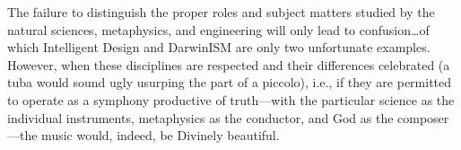 The failure to distinguish the proper roles and subject matters studied by the natural sciences, metaphysics, and engineering will only lead to confusion\ldots of which Intelligent Design and DarwinISM are only two unfortunate examples. However, when these disciplines are respected and their differences celebrated (a tuba would sound ugly usurping the part of a piccolo), i.e., if they are permitted to operate as a symphony productive of truth---with the particular science as the individual instruments, metaphysics as the conductor, and God as the composer---the music would, indeed, be Divinely beautiful.



